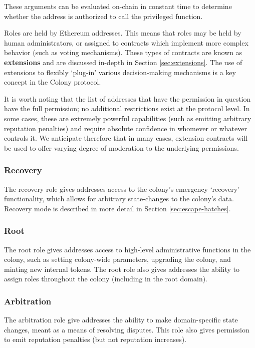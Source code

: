These arguments can be evaluated on-chain in constant time to determine whether the address is authorized to call the privileged function.

Roles are held by Ethereum addresses. This means that roles may be held by human administrators, or assigned to contracts which implement more complex behavior (such as voting mechanisms). These types of contracts are known as \textbf{extensions} and are discussed in-depth in Section \ref{sec:extensions}. The use of extensions to flexibly `plug-in' various decision-making mechanisms is a key concept in the Colony protocol.

It is worth noting that the list of addresses that have the permission in question have the full permission; no additional restrictions exist at the protocol level. In some cases, these are extremely powerful capabilities (such as emitting arbitrary reputation penalties) and require absolute confidence in whomever or whatever controls it. We anticipate therefore that in many cases, extension contracts will be used to offer varying degree of moderation to the underlying permissions.

\subsubsection*{Recovery}

The recovery role gives addresses access to the colony's emergency `recovery' functionality, which allows for arbitrary state-changes to the colony's data. Recovery mode is described in more detail in Section \ref{sec:escape-hatches}.

\subsubsection*{Root}

The root role gives addresses access to high-level administrative functions in the colony, such as setting colony-wide parameters, upgrading the colony, and minting new internal tokens. The root role also gives addresses the ability to assign roles throughout the colony (including in the root domain).

\subsubsection*{Arbitration}

The arbitration role give addresses the ability to make domain-specific state changes, meant as a means of resolving disputes. This role also gives permission to emit reputation penalties (but not reputation increases).

